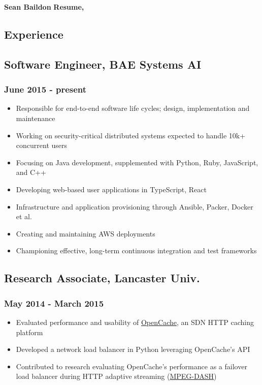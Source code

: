 \documentclass[a4paper,11pt]{article}
\begin{document}
\large
\noindent\textbf{Sean Baildon}
\hfill
\noindent\textbf{Resume, \the\year}
\normalsize

\vspace{2ex}
\hrulefill{}
\vspace{1ex}

\begin{multicols*}{2}

\section*{Experience}
\subsection*{Software Engineer, BAE Systems AI}
\subsubsection*{June 2015 - present}
\begin{itemize}[leftmargin=*]
	\item Responsible for end-to-end software life cycles; design, implementation and maintenance
	\item Working on security-critical distributed systems expected to handle 10k+ concurrent users
	\item Focusing on Java development, supplemented with Python, Ruby, JavaScript, and C++
	\item Developing web-based user applications in TypeScript, React
	\item Infrastructure and application provisioning through Ansible, Packer, Docker et al.
	\item Creating and maintaining AWS deployments
	\item Championing effective, long-term continuous integration and test frameworks
\end{itemize}

\subsection*{Research Associate, Lancaster Univ.}
\subsubsection*{May 2014 - March 2015}
\begin{itemize}[leftmargin=*]
	\item Evaluated performance and usability of \href{https://github.com/broadbent/opencache}{OpenCache}, an SDN HTTP caching platform
	\item Developed a network load balancer in Python leveraging OpenCache's API
	\item Contributed to research evaluating OpenCache's performance as a failover load balancer during HTTP adaptive streaming (\href{https://en.wikipedia.org/wiki/Dynamic_Adaptive_Streaming_over_HTTP}{MPEG-DASH})
\end{itemize}


\end{multicols*}
\end{document}

